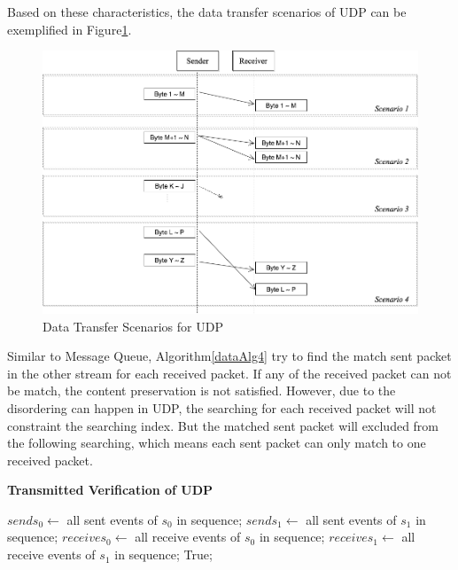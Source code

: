 Based on these characteristics, the data transfer scenarios of UDP can be exemplified in Figure\ref{upd}.
\begin{figure}[H]
\centerline{\includegraphics[scale=0.4]{Figures/udp}}
 \caption{Data Transfer Scenarios for UDP}
\label{upd}
\end{figure}

Similar to Message Queue, Algorithm\ref{dataAlg4} try to find the match sent packet in the other stream for each received packet. If any of the received packet can not be match, the content preservation is not satisfied. However, due to the disordering can happen in UDP, the searching for each received packet will not constraint the searching index. But the matched sent packet will excluded from the following searching, which means each sent packet can only match to one received packet.
\begin{algorithm}[H]
\DontPrintSemicolon
\caption{{\bf Transmitted Verification of UDP} \label{dataAlg4}}
\;
$sends_0 \leftarrow$ all sent events of $s_0$ in sequence;\;
$sends_1 \leftarrow$ all sent events of $s_1$ in sequence;\;
$receives_0 \leftarrow$ all receive events of $s_0$ in sequence;\;
$receives_1 \leftarrow$ all receive events of $s_1$ in sequence;\;
 \KwRet True;\;
\end{algorithm} 


